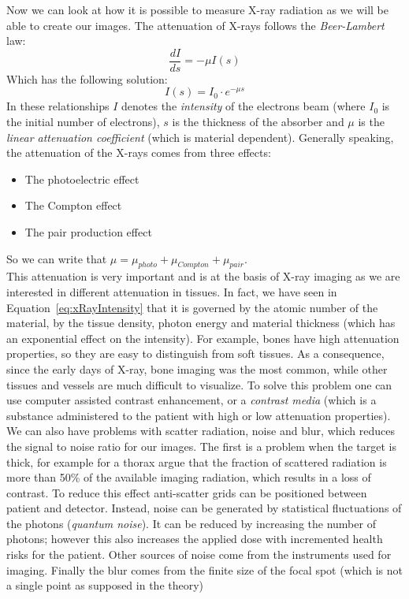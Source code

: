 Now we can look at how it is possible to measure X-ray radiation as we will be able to create our images.
The attenuation of X-rays follows the \textit{Beer-Lambert} law:
\begin{equation} \label{eq:xRayIntensity}
 \frac{dI}{ds} = -\mu I(s)
\end{equation}
Which has the following solution:
\begin{equation}
 I(s) = I_{0} \cdot e^{-\mu s}
\end{equation}
In these relationships $I$ denotes the \textit{intensity} of the electrons beam (where $I_{0}$ is the initial number of electrons), $s$ is the thickness of the absorber and $\mu$ is the \textit{linear attenuation coefficient} (which is material dependent). Generally speaking, the attenuation of the X-rays comes from three effects:
\begin{itemize}
 \item The photoelectric effect
 \item The Compton effect
 \item The pair production effect
\end{itemize}
So we can write that $\mu = \mu_{photo} + \mu_{Compton} + \mu_{pair}$.\\

This attenuation is very important and is at the basis of X-ray imaging as we are interested in different attenuation in tissues. In fact, we have seen in Equation~\ref{eq:xRayIntensity} that it is governed by the atomic number of the material, by the tissue density, photon energy and material thickness (which has an exponential effect on the intensity). For example, bones have high attenuation properties, so they are easy to distinguish from soft tissues. As a consequence, since the early days of X-ray, bone imaging was the most common, while other tissues and vessels are much difficult to visualize. To solve this problem one can use computer assisted contrast enhancement, or a \textit{contrast media} (which is a substance administered to the patient with high or low attenuation properties). We can also have problems with scatter radiation, noise and blur, which reduces the signal to noise ratio for our images. The first is a problem when the target is thick, for example for a thorax \cite{Birkfellner} argue that the fraction of scattered radiation is more than 50\% of the available imaging radiation, which results in a loss of contrast. To reduce this effect anti-scatter grids can be positioned between patient and detector. Instead, noise can be generated by statistical fluctuations of the photons (\textit{quantum noise}). It can be reduced by increasing the number of photons; however this also increases the applied dose with incremented health risks for the patient. Other sources of noise come from the instruments used for imaging. Finally the blur comes from the finite size of the focal spot (which is not a single point as supposed in the theory)

